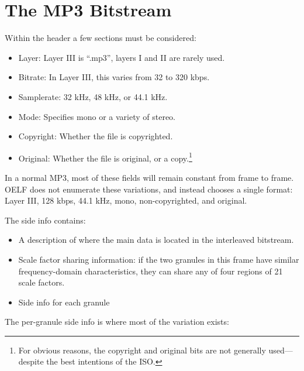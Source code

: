 \documentclass{thesis}
\begin{document}
\begin{singlespace}


\end{singlespace}

\appendix 
{}

\chapter{The MP3 Bitstream}
	
	Within the header a few sections must be considered:
	
\begin{itemize}
	\item Layer: Layer III is ``.mp3'', layers I and II are rarely used.
	\item Bitrate: In Layer III, this varies from 32 to 320 kbps.
	\item Samplerate: 32 kHz, 48 kHz, or 44.1 kHz.
	\item Mode: Specifies mono or a variety of stereo.
	\item Copyright: Whether the file is copyrighted.
	\item Original: Whether the file is original, or a copy.\footnote{For obvious reasons, the copyright and original bits are not generally used---despite the best intentions of the ISO.}	
\end{itemize}

	In a normal MP3, most of these fields will remain constant from frame to frame. OELF does not enumerate these variations, and instead chooses a single format: Layer III, 128 kbps, 44.1 kHz, mono, non-copyrighted, and original.
	
	The side info contains:
	
\begin{itemize}
	\item A description of where the main data is located in the interleaved bitstream.
	\item Scale factor sharing information: if the two granules in this frame have similar frequency-domain characteristics, they can share any of four regions of 21 scale factors.
	\item Side info for each granule
\end{itemize}

	The per-granule side info is where most of the variation exists:
	
\end{document}
